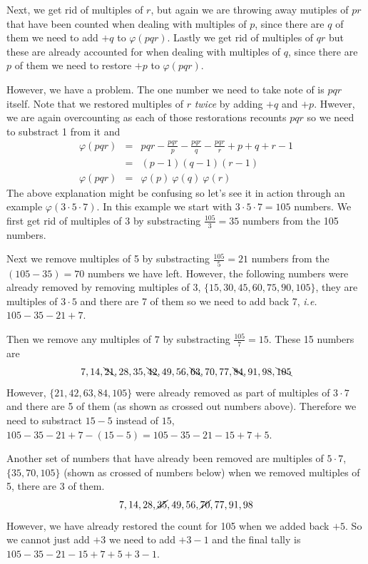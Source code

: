 \documentclass[aps,preprint,preprintnumbers,nofootinbib,showpacs,prd]{revtex4-1}
\newcommand{\ie}{{\it i.e.} }
\newcommand{\nbea}{\begin{eqnarray*}}
\newcommand{\neea}{\end{eqnarray*}}
\begin{document}
Next, we get rid of multiples of $r$, but again we are throwing away mutiples of $pr$ that have been counted when dealing with multiples of $p$, since there are $q$ of them we need to add $+q$ to $\varphi(pqr)$. Lastly we get rid of multiples of $qr$ but these are already accounted for when dealing with multiples of $q$, since there are $p$ of them we need to restore $+p$ to $\varphi(pqr)$.

However, we have a problem. The one number we need to take note of is $pqr$ itself. Note that we restored multiples of $r$ {\it twice} by adding $+q$ and $+p$. Hwever, we are again overcounting as each of those restorations recounts $pqr$ so we need to substract 1 from it and
%
\nbea
\varphi(pqr) & = & pqr - \frac{pqr}{p} - \frac{pqr}{q} - \frac{pqr}{r} + p + q + r - 1 \\
& = & (p-1)(q-1)(r-1) \\
\varphi(pqr) & = & \varphi(p)~\varphi(q)~\varphi(r)
\neea
%
The above explanation might be confusing so let's see it in action through an example $\varphi(3 \cdot 5 \cdot 7)$. In this example we start with $3 \cdot 5 \cdot 7 = 105$ numbers. We first get rid of multiples of 3 by substracting $\frac{105}{3} = 35$ numbers from the 105 numbers.

Next we remove multiples of 5 by substracting $\frac{105}{5} = 21$ numbers from the $(105 - 35) = 70$ numbers we have left. However, the following numbers were already removed by removing multiples of 3, $\{15, 30, 45, 60, 75, 90, 105\}$, they are multiples of $3 \cdot 5$ and there are 7 of them so we need to add back 7, \ie $105 - 35 - 21 + 7$.

Then we remove any multiples of $7$ by substracting $\frac{105}{7} = 15$. These 15 numbers are
%
\nbea
7,14,\bcancel{21},28,35,\bcancel{42},49,56,\bcancel{63},70,77,\bcancel{84},91,98,\bcancel{105}
\neea
%
However, $\{21,42,63,84,105\}$ were already removed as part of multiples of $3\cdot 7$ and there are 5 of them (as shown as crossed out numbers above). Therefore we need to substract $15 - 5$ instead of $15$, $105 - 35 - 21 +7 -(15 - 5) = 105 - 35 - 21 - 15 + 7 + 5$.

Another set of numbers that have already been removed are multiples of $5 \cdot 7$, $\{35,70,105\}$ (shown as crossed of numbers below) when we removed multiples of 5, there are 3 of them. 
%
\nbea
7,14,28,\cancel{35},49,56,\cancel{70},77,91,98
\neea
%
However, we have already restored the count for 105 when we added back $+5$. So we cannot just add $+3$ we need to add $+3 -1$ and the final tally is $105 - 35 - 21 -15 + 7 + 5 + 3 - 1$.
\end{document}
